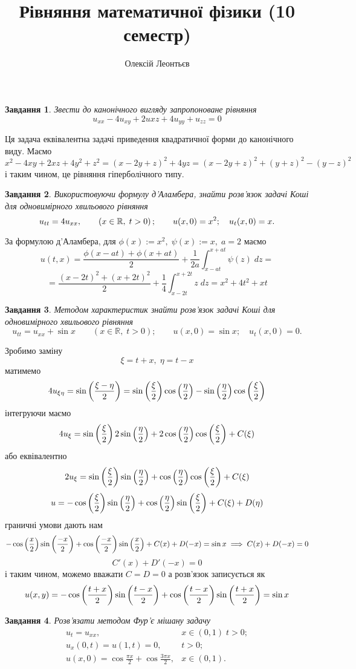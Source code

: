 \documentclass[12pt]{article} %
\title{Рівняння математичної фізики (10 семестр)}
\author{Олексій Леонтьєв}
\newtheorem{prob}{Завдання}
\newcommand{\dt}{\;dt}
\newcommand{\dx}{\;dx}
\begin{document}
\def\dx{\Delta x}
\def\dt{\Delta t}
\def\dX{\frac{\partial}{\partial x}}
\maketitle
\begin{prob}Звести до канонічного вигляду запропоноване рівняння
	\[u_{xx}-4u_{xy}+2u{xz}+4u_{yy}+u_{zz}=0\]
\end{prob}
Ця задача еквівалентна задачі приведення квадратичної форми до канонічного виду. Маємо
\[x^2-4xy+2xz+4y^2+z^2=(x-2y+z)^2+4yz=(x-2y+z)^2+(y+z)^2-(y-z)^2\]
і таким чином, це рівняння гіперболічного типу.
\setcounter{prob}{6}
\begin{prob}Використовуючи формулу д’Аламбера, знайти розв’язок задачі Коші для одновимірного хвильового рівняння
	\[u_{tt}=4u_{xx},\qquad\left(x\in\mathbb{R},\;t>0\right);\qquad u(x,0)=x^2;\quad u_t(x,0)=x.\]
\end{prob}
За формулою д’Аламбера, для $\phi(x):=x^2,\;\psi(x):=x,\;a=2$ маємо
\[u(t,x)=\frac{\phi(x-at)+\phi(x+at)}{2}+\frac{1}{2a}\int_{x-at}^{x+at}\psi(z)\;dz=\]
\[=\frac{(x-2t)^2+(x+2t)^2}{2}+\frac{1}{4}\int_{x-2t}^{x+2t}z\;dz=x^2+4t^2+{xt}\]
\setcounter{prob}{8}
\begin{prob}Методом характеристик знайти розв’язок задачі Коші для одновимірного хвильового рівняння
	\[u_{tt}=u_{xx}+\sin x\qquad(x\in\mathbb{R},\;t>0);\qquad u(x,0)=\sin x;\quad u_t(x,0)=0.\]
\end{prob}
Зробимо заміну
\[\xi=t+x,\;\eta=t-x\]
матимемо
\[4u_{\xi\eta}=\sin\left(\frac{\xi-\eta}{2}\right)=\sin\left(\frac{\xi}{2}\right)\cos\left(\frac{\eta}{2}\right)-\sin\left(\frac{\eta}{2}\right)\cos\left(
\frac{\xi}{2}\right)\]
інтегруючи маємо
\[4u_\xi=\sin\left(\frac{\xi}{2}\right)2\sin\left(\frac{\eta}{2}\right)+2\cos\left(\frac{\eta}{2}\right)\cos\left(\frac{\xi}{2}\right)+C(\xi)\]
або еквівалентно
\[2u_\xi=\sin\left(\frac{\xi}{2}\right)\sin\left(\frac{\eta}{2}\right)+\cos\left(\frac{\eta}{2}\right)\cos\left(\frac{\xi}{2}\right)+C(\xi)\]
\[u=-\cos\left(\frac{\xi}{2}\right)\sin\left(\frac{\eta}{2}\right)+\cos\left(\frac{\eta}{2}\right)\sin\left(\frac{\xi}{2}\right)+C(\xi)+D(\eta)\]
граничні умови дають нам
\[-\cos\left(\frac{x}{2}\right)\sin\left(\frac{-x}{2}\right)+\cos\left(\frac{-x}{2}\right)\sin\left(\frac{x}{2}\right)+C(x)+D(-x)=\sin x\implies
C(x)+D(-x)=0\]
\[C'(x)+D'(-x)=0\]
і таким чином, можемо вважати $C=D=0$ а розв’язок записується як
\[u(x,y)=-\cos\left(\frac{t+x}{2}\right)\sin\left(\frac{t-x}{2}\right)+\cos\left(\frac{t-x}{2}\right)\sin\left(\frac{t+x}{2}\right)=\sin x\]
\setcounter{prob}{11}
\begin{prob}Розв’язати методом Фур’є мішану задачу
	\[
	\begin{array}{cl}
		u_t=u_{xx}, &x\in(0,1)\;t>0;\\
		u_x(0,t)=u(1,t)=0,&t>0;\\
		u(x,0)=\cos\frac{\pi x}{2}+\cos\frac{3\pi x}{2},&x\in(0,1).
	\end{array}
	\]
\end{prob}
\end{document}
